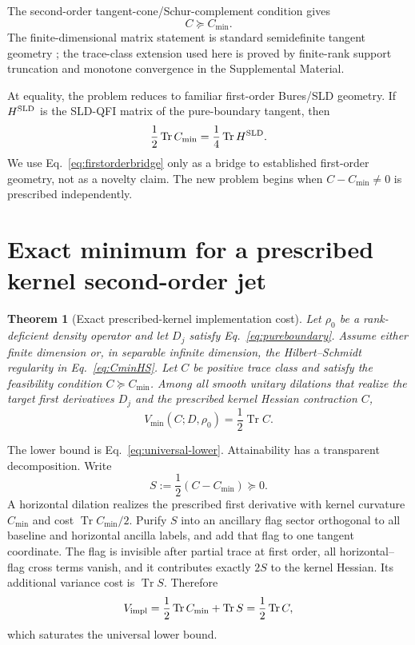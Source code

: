 \documentclass[aps,pra,preprint,nofootinbib]{revtex4-2}
\newtheorem{theorem}{Theorem}
\newcommand{\Tr}{\operatorname{Tr}}
\newcommand{\rhozero}{\rho_0}
\newcommand{\Vimpl}{V_{\rm impl}}
\newcommand{\Vmin}{V_{\min}}
\newcommand{\Cmin}{C_{\min}}
\newcommand{\Cker}{C}
\begin{document}
The second-order tangent-cone/Schur-complement condition gives
\begin{equation}
 \boxed{\Cker\succeq\Cmin.}
 \label{eq:feasible}
\end{equation}
The finite-dimensional matrix statement is standard semidefinite tangent geometry \cite{Shapiro1997,BonnansCominettiShapiro1999}; the trace-class extension used here is proved by finite-rank support truncation and monotone convergence in the Supplemental Material.

At equality, the problem reduces to familiar first-order Bures/SLD geometry. If $H^{\rm SLD}$ is the SLD-QFI matrix of the pure-boundary tangent, then
\begin{equation}
 \frac12\Tr\Cmin=\frac14\Tr H^{\rm SLD}.
 \label{eq:firstorderbridge}
\end{equation}
We use Eq.~\eqref{eq:firstorderbridge} only as a bridge to established first-order geometry, not as a novelty claim. The new problem begins when $\Cker-\Cmin\ne0$ is prescribed independently.

\section{Exact minimum for a prescribed kernel second-order jet}

\begin{theorem}[Exact prescribed-kernel implementation cost]
\label{thm:central}
Let $\rhozero$ be a rank-deficient density operator and let $D_j$ satisfy Eq.~\eqref{eq:pureboundary}. Assume either finite dimension or, in separable infinite dimension, the Hilbert--Schmidt regularity in Eq.~\eqref{eq:CminHS}. Let $\Cker$ be positive trace class and satisfy the feasibility condition $\Cker\succeq\Cmin$. Among all smooth unitary dilations that realize the target first derivatives $D_j$ and the prescribed kernel Hessian contraction $\Cker$,
\begin{equation}
 \boxed{
 \Vmin(\Cker;D,\rhozero)
 =\frac12\Tr\Cker.
 }
 \label{eq:central}
\end{equation}
\end{theorem}

The lower bound is Eq.~\eqref{eq:universal-lower}. Attainability has a transparent decomposition. Write
\begin{equation}
 S:=\frac12(\Cker-\Cmin)\succeq0.
 \label{eq:Sdef}
\end{equation}
A horizontal dilation realizes the prescribed first derivative with kernel curvature $\Cmin$ and cost $\Tr\Cmin/2$. Purify $S$ into an ancillary flag sector orthogonal to all baseline and horizontal ancilla labels, and add that flag to one tangent coordinate. The flag is invisible after partial trace at first order, all horizontal--flag cross terms vanish, and it contributes exactly $2S$ to the kernel Hessian. Its additional variance cost is $\Tr S$. Therefore
\begin{equation}
 \Vimpl=\frac12\Tr\Cmin+\Tr S
 =\frac12\Tr\Cker,
\end{equation}
which saturates the universal lower bound.
\end{document}
